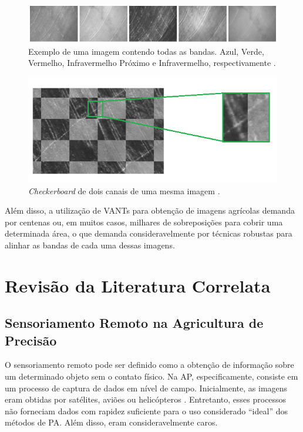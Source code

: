 \documentclass[12pt]{article}
\begin{document}
\begin{figure}[!ht]
    \centering
    \includegraphics[width=0.6\textheight]{figures/espectros.png}
    \caption{Exemplo de uma imagem contendo todas as bandas. Azul, Verde, Vermelho, Infravermelho Próximo e Infravermelho, respectivamente \cite{dias2020uav}.}
    \label{fig:espectros}
\end{figure}

\begin{figure}[!ht]
    \centering
    \includegraphics[width=0.6\textheight]{figures/visualiza_desalinhamento.png}
    \caption{\textit{Checkerboard} de dois canais de uma mesma imagem \cite{dias2020uav}.}
    \label{fig:desalinhamento}
\end{figure}


Além disso, a utilização de VANTs para obtenção de imagens agrícolas demanda por centenas ou, em muitos casos, milhares de sobreposições para cobrir uma determinada área, o que demanda consideravelmente por técnicas robustas para alinhar as bandas de cada uma dessas imagens.


\section{Revisão da Literatura Correlata} 
\label{sec:literatura}


\subsection{Sensoriamento Remoto na Agricultura de Precisão}

O sensoriamento remoto pode ser definido como a obtenção de informação sobre um determinado objeto sem o contato físico. Na AP, especificamente, consiste em um processo de captura de dados em nível de campo. Inicialmente, as imagens eram obtidas por satélites, aviões ou helicópteros \cite{zarco2016new}. Entretanto, esses processos não forneciam dados com rapidez suficiente para o uso considerado ``ideal'' dos métodos de PA. Além disso, eram consideravelmente caros. 
\end{document}
